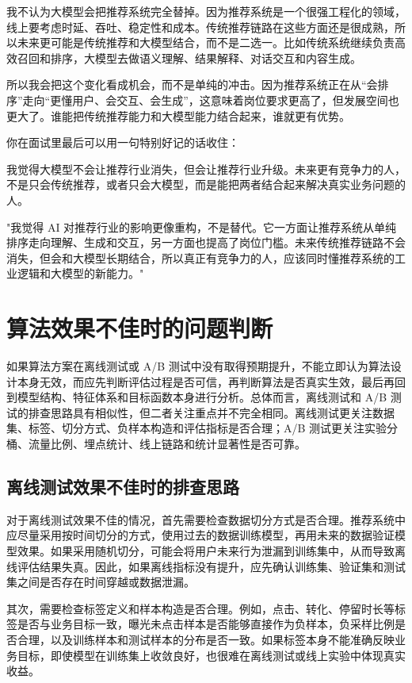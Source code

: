 \documentclass[UTF8]{ctexart}
\begin{document}
我不认为大模型会把推荐系统完全替掉。因为推荐系统是一个很强工程化的领域，线上要考虑时延、吞吐、稳定性和成本。传统推荐链路在这些方面还是很成熟，所以未来更可能是传统推荐和大模型结合，而不是二选一。比如传统系统继续负责高效召回和排序，大模型去做语义理解、结果解释、对话交互和内容生成。

所以我会把这个变化看成机会，而不是单纯的冲击。因为推荐系统正在从“会排序”走向“更懂用户、会交互、会生成”，这意味着岗位要求更高了，但发展空间也更大了。谁能把传统推荐能力和大模型能力结合起来，谁就更有优势。

你在面试里最后可以用一句特别好记的话收住：

我觉得大模型不会让推荐行业消失，但会让推荐行业升级。未来更有竞争力的人，不是只会传统推荐，或者只会大模型，而是能把两者结合起来解决真实业务问题的人。

"我觉得 AI 对推荐行业的影响更像重构，不是替代。它一方面让推荐系统从单纯排序走向理解、生成和交互，另一方面也提高了岗位门槛。未来传统推荐链路不会消失，但会和大模型长期结合，所以真正有竞争力的人，应该同时懂推荐系统的工业逻辑和大模型的新能力。"
\section{算法效果不佳时的问题判断}

如果算法方案在离线测试或 A/B 测试中没有取得预期提升，不能立即认为算法设计本身无效，而应先判断评估过程是否可信，再判断算法是否真实生效，最后再回到模型结构、特征体系和目标函数本身进行分析。总体而言，离线测试和 A/B 测试的排查思路具有相似性，但二者关注重点并不完全相同。离线测试更关注数据集、标签、切分方式、负样本构造和评估指标是否合理；A/B 测试更关注实验分桶、流量比例、埋点统计、线上链路和统计显著性是否可靠。

\subsection{离线测试效果不佳时的排查思路}

对于离线测试效果不佳的情况，首先需要检查数据切分方式是否合理。推荐系统中应尽量采用按时间切分的方式，使用过去的数据训练模型，再用未来的数据验证模型效果。如果采用随机切分，可能会将用户未来行为泄漏到训练集中，从而导致离线评估结果失真。因此，如果离线指标没有提升，应先确认训练集、验证集和测试集之间是否存在时间穿越或数据泄漏。

其次，需要检查标签定义和样本构造是否合理。例如，点击、转化、停留时长等标签是否与业务目标一致，曝光未点击样本是否能够直接作为负样本，负采样比例是否合理，以及训练样本和测试样本的分布是否一致。如果标签本身不能准确反映业务目标，即使模型在训练集上收敛良好，也很难在离线测试或线上实验中体现真实收益。
\end{document}
